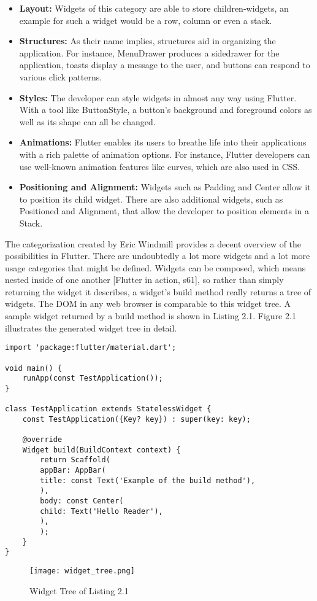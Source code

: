\begin{itemize}
	\item \textbf{Layout:} 
	Widgets of this category are able to store children-widgets, an example for such a widget would be a row, column or even a stack.  
	\item \textbf{Structures:} 
	As their name implies, structures aid in organizing the application.
	For instance, MenuDrawer produces a sidedrawer for the application, toasts display a message to the user, and buttons can respond to various click patterns. 
	\item \textbf{Styles:} 
	The developer can style widgets in almost any way using Flutter. With a tool like ButtonStyle, a button's background and foreground colors as well as its shape can all be changed.
	\item \textbf{Animations:} 
	Flutter enables its users to breathe life into their applications with a rich palette of animation options. For instance, Flutter developers can use well-known animation features like curves, which are also used in CSS. 
	\item \textbf{Positioning and Alignment:} 
	Widgets such as Padding and Center allow it to position its child widget. There are also additional widgets, such as Positioned and Alignment, that allow the developer to position elements in a Stack.
\end{itemize}

The categorization created by Eric Windmill provides a decent overview of the possibilities in Flutter. There are undoubtedly a lot more widgets and a lot more usage categories that might be defined. Widgets can be composed, which means nested inside of one another [Flutter in action, s61], so rather than simply returning the widget it describes, a widget's build method really returns a tree of widgets. The DOM in any web browser is comparable to this widget tree. A sample widget returned by a build method is shown in Listing 2.1. Figure 2.1 illustrates the generated widget tree in detail.
\begin{lstlisting}[caption=Flutter example]
import 'package:flutter/material.dart';

void main() {
	runApp(const TestApplication());
}

class TestApplication extends StatelessWidget {
	const TestApplication({Key? key}) : super(key: key);
	
	@override
	Widget build(BuildContext context) {
		return Scaffold(
		appBar: AppBar(
		title: const Text('Example of the build method'),
		),
		body: const Center(
		child: Text('Hello Reader'),
		),
		);
	}
}

\end{lstlisting}
\begin{figure}[H]
	\centering
	\texttt{[image: widget\_tree.png]}
	\caption[Widget Tree of Listing 2.1]{Widget Tree of Listing 2.1}
\end{figure}
